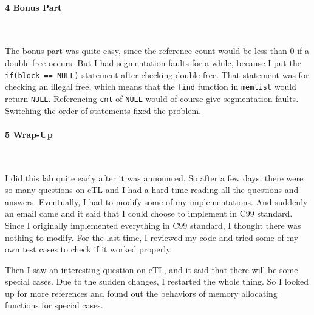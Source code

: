 \documentclass[12pt]{report}
\begin{document}
\paragraph*{\large 4 Bonus Part}~

The bonus part was quite easy, since the reference count would be less than 0 if a double free occurs. But I had segmentation faults for a while, because I put the \texttt{if(block == NULL)} statement after checking double free. That statement was for checking an illegal free, which means that the \texttt{find} function in \texttt{memlist} would return \texttt{NULL}. Referencing \texttt{cnt} of \texttt{NULL} would of course give segmentation faults. Switching the order of statements fixed the problem.\\

\paragraph*{\large 5 Wrap-Up}~

I did this lab quite early after it was announced. So after a few days, there were so many questions on eTL and I had a hard time reading all the questions and answers. Eventually, I had to modify some of my implementations. And suddenly an email came and it said that I could choose to implement in C99 standard. Since I originally implemented everything in C99 standard, I thought there was nothing to modify. For the last time, I reviewed my code and tried some of my own test cases to check if it worked properly.

Then I saw an interesting question on eTL, and it said that there will be some special cases. Due to the sudden changes, I restarted the whole thing. So I looked up for more references and found out the behaviors of memory allocating functions for special cases.
\end{document}
